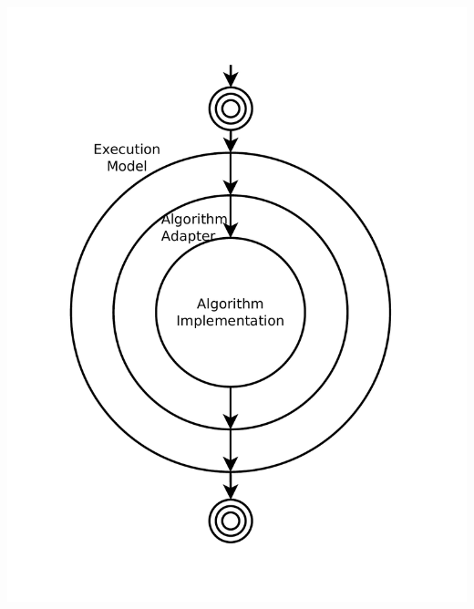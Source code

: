 \begin{frame}
\begin{columns}
\begin{column}{0.35\textwidth}
      \includegraphics[width=1.1\textwidth,trim=2cm 0cm 0cm 0cm,clip]{concentric.pdf}      
    \end{column}
  \end{columns}

\end{frame}

